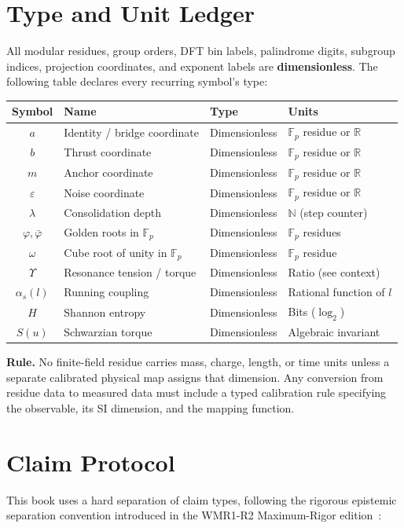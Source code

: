\documentclass[12pt,oneside]{book}
\theoremstyle{principia}
\theoremstyle{definition}
\theoremstyle{remark}
\providecommand{\RR}{\mathbb{R}}
\providecommand{\NN}{\mathbb{N}}
\providecommand{\FF}{\mathbb{F}}
\providecommand{\vp}{\varphi}
\providecommand{\vpbar}{\bar{\varphi}}
\providecommand{\eps}{\varepsilon}
\providecommand{\lam}{\lambda}
\begin{document}
\section{Type and Unit Ledger}
All modular residues, group orders, DFT bin labels, palindrome digits, subgroup indices, projection coordinates, and exponent labels are \textbf{dimensionless}. The following table declares every recurring symbol's type:

\begin{center}
\begin{tabular}{@{}clll@{}}
\toprule
Symbol & Name & Type & Units \\
\midrule
$a$ & Identity / bridge coordinate & Dimensionless & $\FF_p$ residue or $\RR$ \\
$b$ & Thrust coordinate & Dimensionless & $\FF_p$ residue or $\RR$ \\
$m$ & Anchor coordinate & Dimensionless & $\FF_p$ residue or $\RR$ \\
$\eps$ & Noise coordinate & Dimensionless & $\FF_p$ residue or $\RR$ \\
$\lam$ & Consolidation depth & Dimensionless & $\NN$ (step counter) \\
$\vp, \vpbar$ & Golden roots in $\FF_p$ & Dimensionless & $\FF_p$ residues \\
$\omega$ & Cube root of unity in $\FF_p$ & Dimensionless & $\FF_p$ residue \\
$\Upsilon$ & Resonance tension / torque & Dimensionless & Ratio (see context) \\
$\alpha_s(l)$ & Running coupling & Dimensionless & Rational function of $l$ \\
$H$ & Shannon entropy & Dimensionless & Bits ($\log_2$) \\
$S(u)$ & Schwarzian torque & Dimensionless & Algebraic invariant \\
\bottomrule
\end{tabular}
\end{center}

\noindent\textbf{Rule.} No finite-field residue carries mass, charge, length, or time units unless a separate calibrated physical map assigns that dimension. Any conversion from residue data to measured data must include a typed calibration rule specifying the observable, its SI dimension, and the mapping function.

\section{Claim Protocol}
This book uses a hard separation of claim types, following the rigorous epistemic separation convention introduced in the WMR1-R2 Maximum-Rigor edition~\cite{lockwood_larue_dwm}:
\end{document}
